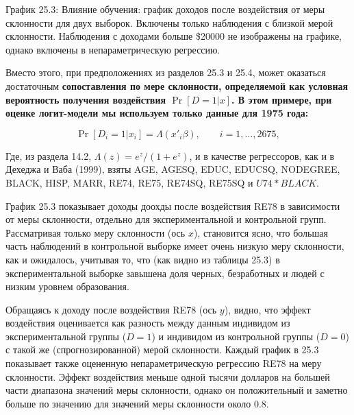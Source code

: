 \vspace{3cm}
График 25.3: Влияние обучения: график доходов после воздействия от меры склонности для двух выборок. Включены только наблюдения с близкой мерой склонности. Наблюдения с доходами больше \$20000 не изображены на графике, однако включены в непараметрическую регрессию. 

Вместо этого, при предположениях из разделов 25.3 и 25.4, может оказаться достаточным \bfseries сопоставления по мере склонности, \mdseries определяемой как условная вероятность получения воздействия $\Pr [D = 1 | x]$. В этом примере, при оценке логит-модели мы используем только данные для 1975 года:

\begin{equation}
\label{eq25.78}
\Pr [D_i = 1 | x_i] = \Lambda (x'_i \beta), \qquad i = 1, \dots, 2675,
\end{equation}

Где, из раздела 14.2, $\Lambda (z) = e^z / (1+e^z)$, и в качестве регрессоров, как и в Дехеджа и Ваба (1999), взяты AGE, AGESQ, EDUC, EDUCSQ, NODEGREE, BLACK, HISP, MARR, RE74, RE75, RE74SQ, RE75SQ и $U74*BLACK$. 

График 25.3 показывает доходы доохды после воздействия RE78 в зависимости от меры склонности, отдельно для экспериментальной и контрольной групп. Рассматривая только меру склонности (ось $x$), становится ясно, что большая часть наблюдений в контрольной выборке имеет очень низкую меру склонности, как и ожидалось, учитывая то, что (как видно из таблицы 25.3) в экспериментальной выборке завышена доля черных, безработных и людей с низким уровнем образования. 

Обращаясь к доходу после воздействия RE78 (ось $y$), видно, что эффект воздействия оценивается как разность между данным индивидом из экспериментальной группы ($D = 1$) и индивидом из контрольной группы ($D = 0$) с такой же (спрогнозированной) мерой склонности. Каждый график в 25.3 показывает также оцененную непараметрическую регрессию RE78 на меру склонности. Эффект воздействия меньше одной тысячи долларов на большей части диапазона значений меры склонности, однако он положительный и заметно больше по значению для значений меры склонности около 0.8. 

